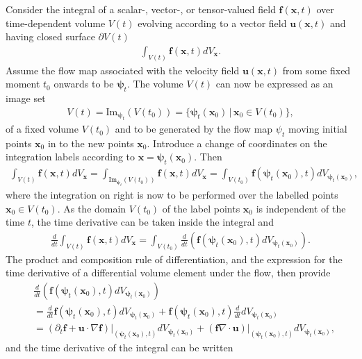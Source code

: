 Consider the integral of a scalar-, vector-, or tensor-valued field $\bm{f}(\bm{x},t)$ over time-dependent volume $V(t)$ evolving according to a vector field $\bm{u}(\bm{x},t)$ and having closed surface $\partial V(t)$
\begin{align}
    \int_{V(t)}\bm{f}(\bm{x},t)dV_{\bm{x}}.
\end{align}
Assume the flow map associated with the velocity field $\bm{u}(\bm{x},t)$ from some fixed moment $t_0$ onwards to be $\bm{\psi}_t$. The volume $V(t)$ can now be expressed as an image set 
\begin{align}
    V(t)=\text{Im}_{\bm{\psi}_t}(V(t_0))=\{\bm{\psi}_t(\bm{x}_0)\,|\,\bm{x}_0\in V(t_0)\},
\end{align}
of a fixed volume $V(t_0)$ and to be generated by the flow map $\psi_t$ moving initial points $\bm{x}_0$ in to the new points $\bm{x}_0$. Introduce a change of coordinates on the integration labels according to $\bm{x}=\bm{\psi}_t(\bm{x}_0)$. Then
\begin{align}
    \int_{V(t)}\bm{f}(\bm{x},t)dV_{\bm{x}}=\int_{\text{Im}_{\bm{\psi}_t}(V(t_0))}\bm{f}(\bm{x},t)dV_{\bm{x}}=\int_{V(t_0)}\bm{f}(\bm{\psi}_t(\bm{x}_0),t)dV_{\bm{\psi}_t(\bm{x}_0)},
\end{align}
where the integration on right is now to be performed over the labelled points $\bm{x}_0\in V(t_0)$. As the domain $V(t_0)$ of the label points $\bm{x}_0$ is independent of the time $t$, the time derivative can be taken inside the integral and 
\begin{align}
    \frac{d}{dt}\int_{V(t)}\bm{f}(\bm{x},t)dV_{\bm{x}}=\int_{V(t_0)}\frac{d}{dt}\left(\bm{f}(\bm{\psi}_t(\bm{x}_0),t)dV_{\bm{\psi}_t(\bm{x}_0)}\right).
\end{align}
The product and composition rule of differentiation, and the expression for the time derivative of a differential volume element under the flow, then provide
\begin{align}
    &\frac{d}{dt}\left(\bm{f}(\bm{\psi}_t(\bm{x}_0),t)dV_{\bm{\psi}_t(\bm{x}_0)}\right)\nonumber\\
    &=\frac{d}{dt}\bm{f}(\bm{\psi}_t(\bm{x}_0),t) dV_{\bm{\psi}_t(\bm{x}_0)}+\bm{f}(\bm{\psi}_t(\bm{x}_0),t)\frac{d}{dt}dV_{\bm{\psi}_t(\bm{x}_0)}\nonumber\\
    &=(\partial_t\bm{f}+\bm{u}\cdot\nabla\bm{f})\Big|_{(\bm{\psi}_t(\bm{x}_0),t)}dV_{\bm{\psi}_t(\bm{x}_0)}+(\bm{f}\nabla\cdot\bm{u})\Big|_{(\bm{\psi}_t(\bm{x}_0),t)}dV_{\bm{\psi}_t(\bm{x}_0)},
\end{align}
and the time derivative of the integral can be written
